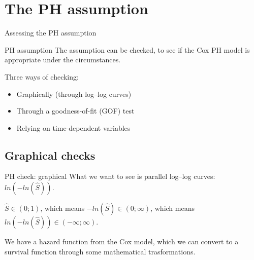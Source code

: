 \documentclass[12pt,english,pdf,xcolor=dvipsnames,aspectratio=169,handout]{beamer}\usepackage[]{graphicx}\usepackage[]{xcolor}
\begin{document}
\section{The PH assumption}

\begin{frame}

\begin{center}
\huge Assessing the PH assumption
\end{center}
\end{frame}



\begin{frame}{PH assumption}
The assumption can be checked, to see if the Cox PH model is appropriate under the circumstances.\bigskip

Three ways of checking:
\begin{itemize}
\item Graphically (through log--log curves)
\item Through a goodness-of-fit (GOF) test
\item Relying on time-dependent variables
\end{itemize}
\end{frame}



\subsection{Graphical checks}
\begin{frame}{PH check: graphical}
What we want to see is parallel log--log curves: $ln(-ln(\widehat{S}))$.\bigskip

$\widehat{S} \in (0;1)$, which means $-ln(\widehat{S}) \in (0;\infty)$, which means $ln(-ln(\widehat{S})) \in (-\infty; \infty)$.\bigskip

We have a hazard function from the Cox model, which we can convert to a survival function through some mathematical trasformations.
\end{frame}
\end{document}
